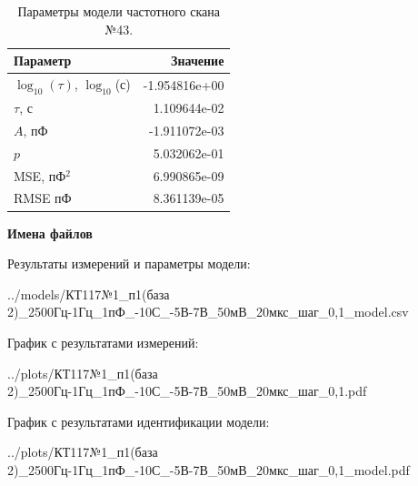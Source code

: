 \begin{table}[!ht]
    \centering
    \caption{Параметры модели частотного скана №43.}
    \begin{tabular}{|l|r|}
        \hline
        Параметр                                       & Значение                  \\ \hline
        $\log_{10}(\tau)$, $\log_{10}$(с)              & -1.954816e+00             \\ \hline
        $\tau$, с                                      & 1.109644e-02              \\ \hline
        $A$, пФ                                        & -1.911072e-03             \\ \hline
        $p$                                            & 5.032062e-01              \\ \hline
        MSE, пФ$^2$                                    & 6.990865e-09              \\ \hline
        RMSE пФ                                        & 8.361139e-05              \\ \hline
    \end{tabular}
    \label{table:frequency_scan_model_43}
\end{table}

\textbf{Имена файлов}

Результаты измерений и параметры модели:

\scriptsize../models/КТ117№1\_п1(база 2)\_2500Гц-1Гц\_1пФ\_-10С\_-5В-7В\_50мВ\_20мкс\_шаг\_0,1\_model.csv
\normalsize

График с результатами измерений:

\scriptsize../plots/КТ117№1\_п1(база 2)\_2500Гц-1Гц\_1пФ\_-10С\_-5В-7В\_50мВ\_20мкс\_шаг\_0,1.pdf
\normalsize

График с результатами идентификации модели:

\scriptsize../plots/КТ117№1\_п1(база 2)\_2500Гц-1Гц\_1пФ\_-10С\_-5В-7В\_50мВ\_20мкс\_шаг\_0,1\_model.pdf
\normalsize

